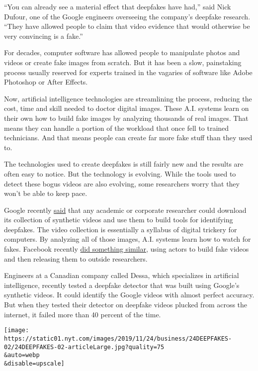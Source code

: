 ``You can already see a material effect that deepfakes have had,'' said
Nick Dufour, one of the Google engineers overseeing the company's
deepfake research. ``They have allowed people to claim that video
evidence that would otherwise be very convincing is a fake.''

For decades, computer software has allowed people to manipulate photos
and videos or create fake images from scratch. But it has been a slow,
painstaking process usually reserved for experts trained in the vagaries
of software like Adobe Photoshop or After Effects.

Now, artificial intelligence technologies are streamlining the process,
reducing the cost, time and skill needed to doctor digital images. These
A.I. systems learn on their own how to build fake images by analyzing
thousands of real images. That means they can handle a portion of the
workload that once fell to trained technicians. And that means people
can create far more fake stuff than they used to.

The technologies used to create deepfakes is still fairly new and the
results are often easy to notice. But the technology is evolving. While
the tools used to detect these bogus videos are also evolving, some
researchers worry that they won't be able to keep pace.

Google recently
\href{https://ai.googleblog.com/2019/09/contributing-data-to-deepfake-detection.html}{said}
that any academic or corporate researcher could download its collection
of synthetic videos and use them to build tools for identifying
deepfakes. The video collection is essentially a syllabus of digital
trickery for computers. By analyzing all of those images, A.I. systems
learn how to watch for fakes. Facebook recently
\href{https://ai.facebook.com/blog/deepfake-detection-challenge/}{did
something similar}, using actors to build fake videos and then releasing
them to outside researchers.

Engineers at a Canadian company called Dessa, which specializes in
artificial intelligence, recently tested a deepfake detector that was
built using Google's synthetic videos. It could identify the Google
videos with almost perfect accuracy. But when they tested their detector
on deepfake videos plucked from across the internet, it failed more than
40 percent of the time.

\texttt{[image: https://static01.nyt.com/images/2019/11/24/business/24DEEPFAKES-02/24DEEPFAKES-02-articleLarge.jpg?quality=75\\\&auto=webp\\\&disable=upscale]}

